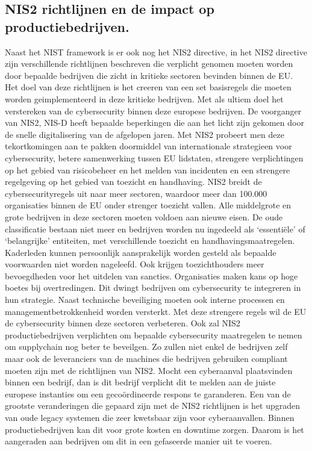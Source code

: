 \subsection{NIS2 richtlijnen en de impact op productiebedrijven.}
Naast het NIST framework is er ook nog het NIS2 directive, in het NIS2 directive zijn verschillende richtlijnen beschreven die verplicht genomen moeten worden door bepaalde bedrijven die zicht in kritieke sectoren bevinden binnen de EU. Het doel van deze richtlijnen is het creeren van een set basisregels die moeten worden geimplementeerd in deze kritieke bedrijven. Met als ultiem doel het verstereken van de cybersecurity binnen deze europese bedrijven. \autocite{VanLeeuwen2025}
De voorganger van NIS2, NIS-D heeft bepaalde beperkingen die aan het licht zijn gekomen door de snelle digitalisering van de afgelopen jaren. Met NIS2 probeert men deze tekortkomingen aan te pakken doormiddel van internationale strategieen voor cybersecurity, betere samenwerking tussen EU lidstaten, strengere verplichtingen op het gebied van risicobeheer en het melden van incidenten en een strengere regelgeving op het gebied van toezicht en handhaving. \autocite{Ey2025}
NIS2 breidt de cybersecurityregels uit naar meer sectoren, waardoor meer dan 100.000 organisaties binnen de EU onder strenger toezicht vallen. Alle middelgrote en grote bedrijven in deze sectoren moeten voldoen aan nieuwe eisen. De oude classificatie bestaan niet meer en bedrijven worden nu ingedeeld als ‘essentiële’ of ‘belangrijke’ entiteiten, met verschillende toezicht en handhavingsmaatregelen. Kaderleden kunnen persoonlijk aansprakelijk worden gesteld als bepaalde voorwaarden niet worden nageleefd. Ook krijgen toezichthouders meer bevoegdheden voor het uitdelen van sancties. Organisaties maken kans op hoge boetes bij overtredingen. Dit dwingt bedrijven om cybersecurity te integreren in hun strategie. Naast technische beveiliging moeten ook interne processen en managementbetrokkenheid worden versterkt. Met deze strengere regels wil de EU de cybersecurity binnen deze sectoren verbeteren. \autocite{Ey2025}
Ook zal NIS2 productiebedrijven verplichten om bepaalde cybersecurity maatregelen te nemen om supplychain nog beter te beveilgen. Zo zullen niet enkel de bedrijven zelf maar ook de leveranciers van de machines die bedrijven gebruiken compliant moeten zijn met de richtlijnen van NIS2. Mocht een cyberaanval plaatsvinden binnen een bedrijf, dan is dit bedrijf verplicht dit te melden aan de juiste europese instanties om een gecoördineerde respons te garanderen. Een van de grootste veranderingen die gepaard zijn met de NIS2 richtlijnen is het upgraden van oude legacy systemen die zeer kwetsbaar zijn voor cyberaanvallen. Binnen productiebedrijven kan dit voor grote kosten en downtime zorgen. Daarom is het aangeraden aan bedrijven om dit in een gefaseerde manier uit te voeren. \autocite{Lansweeper2024}


